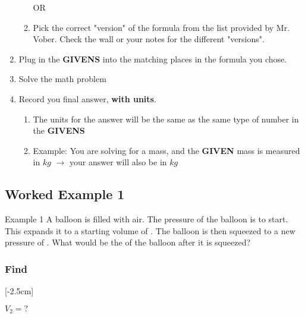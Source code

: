 \documentclass[../../main.tex]{subfiles}
\begin{document}
\begin{enumerate}
\begin{enumerate}
		            OR

		      \item Pick the correct "version" of the formula from the list provided by Mr. Vober.  Check the wall or your notes for the different "versions".
	      \end{enumerate}
	\item Plug in the \textbf{GIVENS} into the matching places in the formula you chose.
	\item Solve the math problem
	\item Record you final answer, \textbf{with units}.
	\begin{enumerate}
		\item The units for the answer will be the same as the same type of number in the \textbf{GIVENS}
		\item Example: You are solving for a mass, and the \textbf{GIVEN} mass is measured in $kg$ $\rightarrow$ your answer will also be in $kg$
	\end{enumerate}
\end{enumerate}

\subsection{Worked Example 1}

\begin{boxGray}{Example 1}
	A balloon is filled with air.  The pressure of the balloon is  to start.  This expands it to a starting volume of .  The balloon is then squeezed to a new pressure of .  What would be the  of the balloon after it is squeezed?
\end{boxGray}

\subsubsection{Find}

[-2.5cm]

$V_2 = ?$

\end{document}

